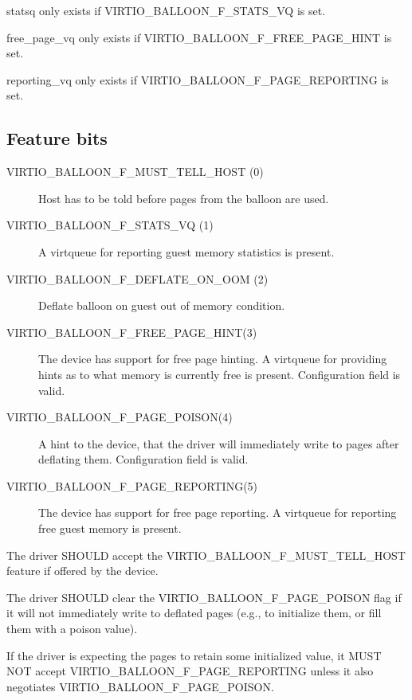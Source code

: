   statsq only exists if VIRTIO_BALLOON_F_STATS_VQ is set.

  free_page_vq only exists if VIRTIO_BALLOON_F_FREE_PAGE_HINT is set.

  reporting_vq only exists if VIRTIO_BALLOON_F_PAGE_REPORTING is set.

\subsection{Feature bits}\label{sec:Device Types / Memory Balloon Device / Feature bits}
\begin{description}
\item[VIRTIO_BALLOON_F_MUST_TELL_HOST (0)] Host has to be told before
    pages from the balloon are used.

\item[VIRTIO_BALLOON_F_STATS_VQ (1)] A virtqueue for reporting guest
    memory statistics is present.
\item[VIRTIO_BALLOON_F_DEFLATE_ON_OOM (2) ] Deflate balloon on
    guest out of memory condition.
\item[ VIRTIO_BALLOON_F_FREE_PAGE_HINT(3) ] The device has support for free
    page hinting. A virtqueue for providing hints as to what memory is
    currently free is present. Configuration field 
    is valid.
\item[ VIRTIO_BALLOON_F_PAGE_POISON(4) ] A hint to the device, that the driver
    will immediately write  to pages after deflating them.
    Configuration field  is valid.
\item[ VIRTIO_BALLOON_F_PAGE_REPORTING(5) ] The device has support for free
    page reporting. A virtqueue for reporting free guest memory is present.

\end{description}

The driver SHOULD accept the VIRTIO_BALLOON_F_MUST_TELL_HOST
feature if offered by the device.

The driver SHOULD clear the VIRTIO_BALLOON_F_PAGE_POISON flag if it will
not immediately write  to deflated pages (e.g., to
initialize them, or fill them with a poison value).

If the driver is expecting the pages to retain some initialized value,
it MUST NOT accept VIRTIO_BALLOON_F_PAGE_REPORTING unless it also
negotiates VIRTIO_BALLOON_F_PAGE_POISON.

